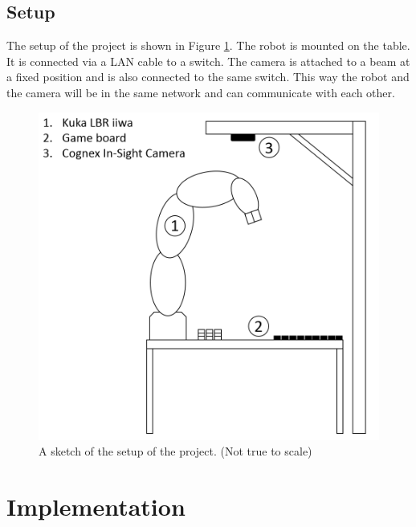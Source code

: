 \documentclass[a4paper]{spie}  %
\begin{document}
\begin{large}
\subsection{Setup}
The setup of the project is shown in Figure \ref{setup_overview}. The robot is mounted on the table. It is connected via a LAN cable to a switch. The camera is attached to a beam at a fixed position and is also connected to the same switch. This way the robot and the camera will be in the same network and can communicate with each other.
\begin{figure}[h]
\includegraphics[width=13cm]{images/setup_overview.png}
\centering
\caption{A sketch of the setup of the project. (Not true to scale)}
\label{setup_overview}
\end{figure}
\clearpage
\section{Implementation}

\end{large}
\end{document}
